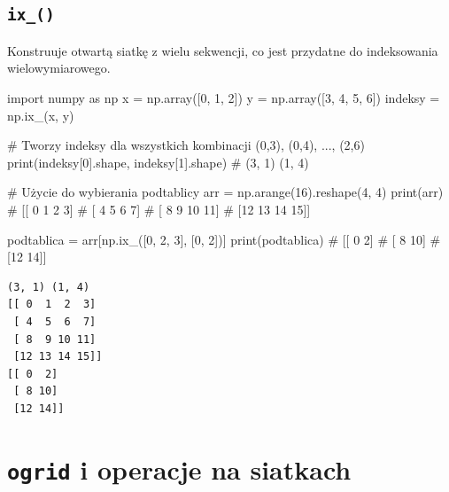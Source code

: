 \documentclass[
  polish,
  letterpaper,
  DIV=11,
  numbers=noendperiod]{scrreprt}
\newenvironment{Shaded}{\begin{snugshade}}{\end{snugshade}}
\newcommand{\BuiltInTok}[1]{\textcolor[rgb]{0.00,0.23,0.31}{#1}}
\newcommand{\CommentTok}[1]{\textcolor[rgb]{0.37,0.37,0.37}{#1}}
\newcommand{\DecValTok}[1]{\textcolor[rgb]{0.68,0.00,0.00}{#1}}
\newcommand{\ImportTok}[1]{\textcolor[rgb]{0.00,0.46,0.62}{#1}}
\newcommand{\NormalTok}[1]{\textcolor[rgb]{0.00,0.23,0.31}{#1}}
\newcommand{\OperatorTok}[1]{\textcolor[rgb]{0.37,0.37,0.37}{#1}}
\begin{document}
\subsection{\texorpdfstring{\texttt{ix\_()}}{ix\_()}}\label{ix_}

Konstruuje otwartą siatkę z wielu sekwencji, co jest przydatne do
indeksowania wielowymiarowego.

\begin{Shaded}
\begin{Highlighting}[]
\ImportTok{import}\NormalTok{ numpy }\ImportTok{as}\NormalTok{ np}
\NormalTok{x }\OperatorTok{=}\NormalTok{ np.array([}\DecValTok{0}\NormalTok{, }\DecValTok{1}\NormalTok{, }\DecValTok{2}\NormalTok{])}
\NormalTok{y }\OperatorTok{=}\NormalTok{ np.array([}\DecValTok{3}\NormalTok{, }\DecValTok{4}\NormalTok{, }\DecValTok{5}\NormalTok{, }\DecValTok{6}\NormalTok{])}
\NormalTok{indeksy }\OperatorTok{=}\NormalTok{ np.ix\_(x, y)}

\CommentTok{\# Tworzy indeksy dla wszystkich kombinacji (0,3), (0,4), ..., (2,6)}
\BuiltInTok{print}\NormalTok{(indeksy[}\DecValTok{0}\NormalTok{].shape, indeksy[}\DecValTok{1}\NormalTok{].shape)  }\CommentTok{\# (3, 1) (1, 4)}

\CommentTok{\# Użycie do wybierania podtablicy}
\NormalTok{arr }\OperatorTok{=}\NormalTok{ np.arange(}\DecValTok{16}\NormalTok{).reshape(}\DecValTok{4}\NormalTok{, }\DecValTok{4}\NormalTok{)}
\BuiltInTok{print}\NormalTok{(arr)}
\CommentTok{\# [[ 0  1  2  3]}
\CommentTok{\#  [ 4  5  6  7]}
\CommentTok{\#  [ 8  9 10 11]}
\CommentTok{\#  [12 13 14 15]]}

\NormalTok{podtablica }\OperatorTok{=}\NormalTok{ arr[np.ix\_([}\DecValTok{0}\NormalTok{, }\DecValTok{2}\NormalTok{, }\DecValTok{3}\NormalTok{], [}\DecValTok{0}\NormalTok{, }\DecValTok{2}\NormalTok{])]}
\BuiltInTok{print}\NormalTok{(podtablica)}
\CommentTok{\# [[ 0  2]}
\CommentTok{\#  [ 8 10]}
\CommentTok{\#  [12 14]]}
\end{Highlighting}
\end{Shaded}

\begin{verbatim}
(3, 1) (1, 4)
[[ 0  1  2  3]
 [ 4  5  6  7]
 [ 8  9 10 11]
 [12 13 14 15]]
[[ 0  2]
 [ 8 10]
 [12 14]]
\end{verbatim}

\section{\texorpdfstring{\texttt{ogrid} i operacje na
siatkach}{ogrid i operacje na siatkach}}\label{ogrid-i-operacje-na-siatkach}
\end{document}
